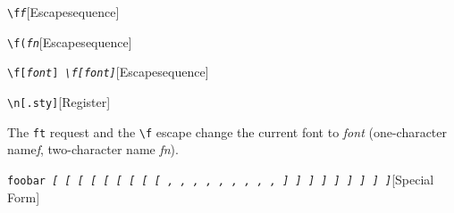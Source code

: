 \documentclass{book}
\begin{document}
%
\noindent\texttt{\texttt{\textbackslash{}f}\textnormal{\textsl{f}}\texttt{}}\hfill[Escape\hbox{}sequence]



%
\noindent\texttt{\texttt{\textbackslash{}f(}\textnormal{\textsl{fn}}\texttt{}}\hfill[Escape\hbox{}sequence]



%
\noindent\texttt{\texttt{\textbackslash{}f[}\textnormal{\textsl{font}}\texttt{]} \EmbracOn{}\textsl{\EmbracOff{}\texttt{\textbackslash{}f[}\EmbracOn{}\EmbracOff{}\textnormal{\textsl{font}}\EmbracOn{}\EmbracOff{}\texttt{]}\EmbracOn{}}}\hfill[Escape\hbox{}sequence]



%
\noindent\texttt{\texttt{\textbackslash{}n[.sty]}}\hfill[Register]



%
The \texttt{ft} request and the \texttt{\textbackslash{}f} escape change the current font
to \textsl{font} (one-character name\hbox{}\textsl{f}, two-character name
\textsl{fn}).

\noindent\texttt{foobar \EmbracOn{}\textsl{[ \EmbracOff{}\textnormal{[}\EmbracOn{} \EmbracOff{}\textsl{[}\EmbracOn{} \EmbracOff{}\texttt{[}\EmbracOn{} \EmbracOff{}\texttt{[}\EmbracOn{} \EmbracOff{}\textnormal{\textsl{[}}\EmbracOn{} \EmbracOff{}\textnormal{\texttt{[}}\EmbracOn{} \EmbracOff{}\textnormal{\texttt{\textsl{[}}}\EmbracOn{} \EmbracOff{}\textnormal{\texttt{[}}\EmbracOn{} , \EmbracOff{}\textnormal{,}\EmbracOn{} \EmbracOff{}\textsl{,}\EmbracOn{} \EmbracOff{}\texttt{,}\EmbracOn{} \EmbracOff{}\texttt{,}\EmbracOn{} \EmbracOff{}\textnormal{\textsl{,}}\EmbracOn{} \EmbracOff{}\textnormal{\texttt{,}}\EmbracOn{} \EmbracOff{}\textnormal{\texttt{\textsl{,}}}\EmbracOn{} \EmbracOff{}\textnormal{\texttt{,}}\EmbracOn{} ] \EmbracOff{}\textnormal{]}\EmbracOn{} \EmbracOff{}\textsl{]}\EmbracOn{} \EmbracOff{}\texttt{]}\EmbracOn{} \EmbracOff{}\texttt{]}\EmbracOn{} \EmbracOff{}\textnormal{\textsl{]}}\EmbracOn{} \EmbracOff{}\textnormal{\texttt{]}}\EmbracOn{} \EmbracOff{}\textnormal{\texttt{\textsl{]}}}\EmbracOn{} \EmbracOff{}\textnormal{\texttt{]}}\EmbracOn{}}}\hfill[Special Form]
\end{document}
